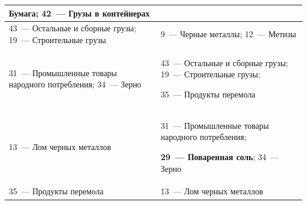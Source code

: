 \begin{table}
\begin{center}
\begin{tabular}{|p{7.8cm}||p{7.8cm}|}
 Бумага; 42~--- Грузы в контейнерах\\

\hline

43~--- Остальные и сборные грузы; 19~--- Строительные грузы

&

9~--- Черные металлы; 12~--- Метизы\\

\hline

31~--- Промышленные товары народного потребления; 34~--- Зерно

&43~--- Остальные и сборные грузы; 19~--- Строительные грузы;

35~--- Продукты перемола \\

\hline

13~--- Лом черных металлов

&

31~--- Промышленные товары народного потребления;

\textbf{29~--- Поваренная соль}; 34~--- Зерно\\

\hline

35~--- Продукты перемола

& 13~--- Лом черных металлов\\

\hline

\end{tabular}

\end{center}

\end{table}




